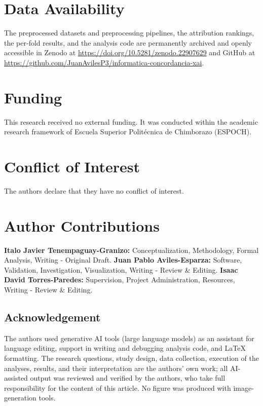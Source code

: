 \documentclass[11pt,twoside,a4paper]{article}
\begin{document}
\clearpage

\section*{Data Availability}
The preprocessed datasets and preprocessing pipelines, the attribution rankings, the per-fold results, and the analysis code are permanently archived and openly accessible in Zenodo at \url{https://doi.org/10.5281/zenodo.22907629} and GitHub at \url{https://github.com/JuanAvilesP3/informatica-concordancia-xai}.

\section*{Funding}
This research received no external funding. It was conducted within the academic research framework of Escuela Superior Polit\'ecnica de Chimborazo (ESPOCH).

\section*{Conflict of Interest}
The authors declare that they have no conflict of interest.

\section*{Author Contributions}
\textbf{Italo Javier Tenempaguay-Granizo:} Conceptualization, Methodology, Formal Analysis, Writing - Original Draft. \textbf{Juan Pablo Aviles-Esparza:} Software, Validation, Investigation, Visualization, Writing - Review \& Editing. \textbf{Isaac David Torres-Paredes:} Supervision, Project Administration, Resources, Writing - Review \& Editing.

\subsection*{Acknowledgement}
The authors used generative AI tools (large language models) as an assistant for language editing, support in writing and debugging analysis code, and LaTeX formatting. The research questions, study design, data collection, execution of the analyses, results, and their interpretation are the authors' own work; all AI-assisted output was reviewed and verified by the authors, who take full responsibility for the content of this article. No figure was produced with image-generation tools.



\end{document}
